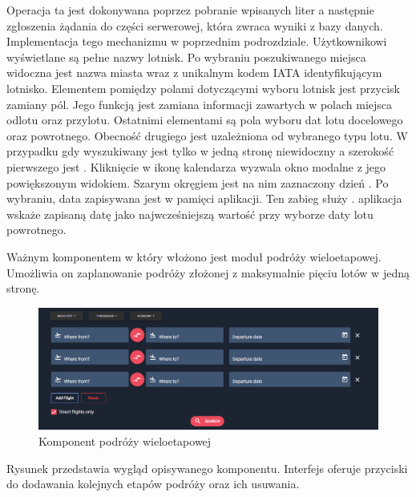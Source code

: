 \documentclass[12pt, twoside]{report}
\begin{document}
Operacja ta jest dokonywana poprzez pobranie wpisanych liter a następnie zgłoszenia żądania do części serwerowej, która zwraca wyniki z bazy danych. Implementacja tego mechanizmu  w poprzednim podrozdziale. Użytkownikowi wyświetlane są pełne nazwy lotnisk. Po wybraniu poszukiwanego miejsca widoczna jest nazwa miasta wraz z unikalnym kodem IATA identyfikującym lotnisko. Elementem  pomiędzy polami dotyczącymi wyboru lotnisk jest przycisk zamiany pól. Jego funkcją jest zamiana informacji zawartych w polach miejsca odlotu oraz przylotu. Ostatnimi elementami są pola wyboru dat lotu docelowego oraz powrotnego. Obecność drugiego jest uzależniona od wybranego typu lotu. W przypadku gdy wyszukiwany jest tylko  w jedną stronę  niewidoczny a szerokość pierwszego jest . Kliknięcie w ikonę kalendarza wyzwala okno modalne z jego powiększonym widokiem. Szarym okręgiem jest na nim zaznaczony dzień . Po wybraniu, data zapisywana jest w pamięci aplikacji. Ten zabieg służy .  aplikacja wskaże zapisaną datę jako najwcześniejszą wartość przy wyborze daty lotu powrotnego. 

Ważnym komponentem w który włożono  jest moduł podróży wieloetapowej. Umożliwia on zaplanowanie podróży złożonej z maksymalnie pięciu lotów w jedną stronę. 
\begin{figure}[!ht]
\centering
\includegraphics[scale=0.40, keepaspectratio]{multi_panel.png}
\caption{Komponent podróży wieloetapowej}
\label{fig:multi_panel}
\end{figure}
Rysunek  przedstawia wygląd opisywanego komponentu. Interfejs oferuje przyciski do dodawania kolejnych etapów podróży oraz ich usuwania.  
\end{document}
